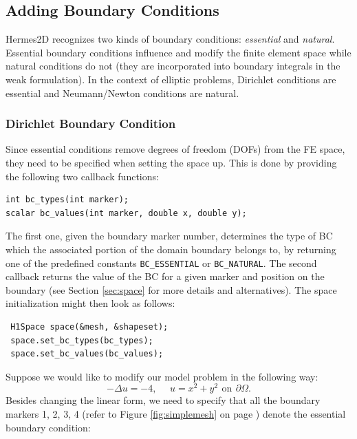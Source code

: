 
\subsection{Adding Boundary Conditions}
\label{sec:bc}

Hermes2D recognizes two kinds of boundary conditions: {\em essential} and {\em natural}.
Essential boundary conditions influence and modify the finite element space while natural
conditions do not (they are incorporated into boundary integrals in the weak formulation).
In the context of elliptic problems, Dirichlet conditions are essential and Neumann/Newton
conditions are natural.


\subsubsection{Dirichlet Boundary Condition}

Since essential conditions remove degrees of freedom (DOFs) from the FE space, they need to be
specified when setting the space up. This is done by providing the following two callback functions:

\begin{lstlisting}
int bc_types(int marker);
scalar bc_values(int marker, double x, double y);
\end{lstlisting}

The first one, given the boundary marker number, determines the type of BC which the associated
portion of the domain boundary belongs to, by returning one of the predefined constants \verb"BC_ESSENTIAL"
or \verb"BC_NATURAL". The second callback returns the value of the BC for a given marker and
position on the boundary (see Section \ref{sec:space} for more details and alternatives). The space
initialization might then look as follows:

\begin{lstlisting}
 H1Space space(&mesh, &shapeset);
 space.set_bc_types(bc_types);
 space.set_bc_values(bc_values);
\end{lstlisting}

Suppose we would like to modify our model problem in the following way:
$$-\Delta u = -4,\ \ \ \ \ \ u = x^2 + y^2\,\ \mbox{on}\,\ \partial \Omega.$$
Besides changing the linear form, we need to specify that all the boundary markers 1, 2, 3, 4
(refer to Figure \ref{fig:simplemesh} on page \pageref{fig:simplemesh}) denote the essential
boundary condition:

